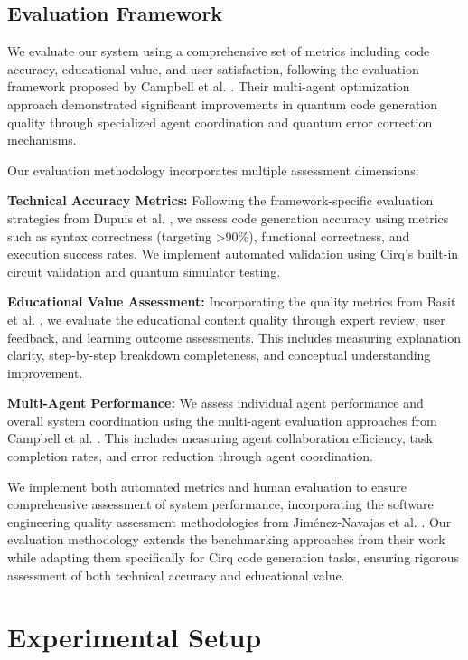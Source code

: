 \documentclass[runningheads]{llncs}
\begin{document}
\subsection{Evaluation Framework}
We evaluate our system using a comprehensive set of metrics including code accuracy, educational value, and user satisfaction, following the evaluation framework proposed by Campbell et al. \cite{campbell2025enhancingllmbasedquantumcode}. Their multi-agent optimization approach demonstrated significant improvements in quantum code generation quality through specialized agent coordination and quantum error correction mechanisms.

Our evaluation methodology incorporates multiple assessment dimensions:

\textbf{Technical Accuracy Metrics:} Following the framework-specific evaluation strategies from Dupuis et al. \cite{10691762}, we assess code generation accuracy using metrics such as syntax correctness (targeting >90\%), functional correctness, and execution success rates. We implement automated validation using Cirq's built-in circuit validation and quantum simulator testing.

\textbf{Educational Value Assessment:} Incorporating the quality metrics from Basit et al. \cite{basit2025pennylangpioneeringllmbasedquantum}, we evaluate the educational content quality through expert review, user feedback, and learning outcome assessments. This includes measuring explanation clarity, step-by-step breakdown completeness, and conceptual understanding improvement.

\textbf{Multi-Agent Performance:} We assess individual agent performance and overall system coordination using the multi-agent evaluation approaches from Campbell et al. \cite{campbell2025enhancingllmbasedquantumcode}. This includes measuring agent collaboration efficiency, task completion rates, and error reduction through agent coordination.

We implement both automated metrics and human evaluation to ensure comprehensive assessment of system performance, incorporating the software engineering quality assessment methodologies from Jiménez-Navajas et al. \cite{jimenez2025codegeneration}. Our evaluation methodology extends the benchmarking approaches from their work while adapting them specifically for Cirq code generation tasks, ensuring rigorous assessment of both technical accuracy and educational value.

\section{Experimental Setup}
\end{document}
